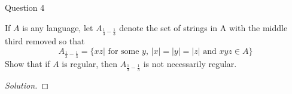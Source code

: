 \begin{solution}{Question 4}\label{ques:4}
    \begin{question}
    If $A$ is any language, let $A_{\frac{1}{3} -\frac{1}{3}}$ denote the set of strings in A with the middle third removed so that
    \begin{equation}
        A_{\frac{1}{3} -\frac{1}{3}} = \{xz | \text{ for some $y$, }|x| = |y| = |z| \text{ and } xyz \in A\}
    \end{equation}
    Show that if $A$ is regular, then $A_{\frac{1}{3} -\frac{1}{3}}$ is not necessarily regular.
    \end{question}
    \tcblower{}
    \begin{proof}[Solution]
    \end{proof}
\end{solution}
